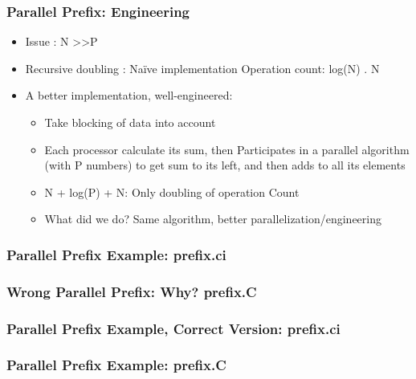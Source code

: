 \documentclass{beamer}
\begin{document}
\begin{frame}[fragile]
  \frametitle{Parallel Prefix: Engineering}
  \begin{itemize}
    \item Issue : N \textgreater \textgreater  P
    \item Recursive doubling : Naïve implementation
    Operation count: log(N) . N
    \item A better implementation, well-engineered:
    \begin{itemize}
    \item Take blocking of data into account
    \item Each processor calculate its sum, then 
            Participates in a parallel algorithm (with P numbers) 
            to get sum to its left, and then adds to all its elements
    \item N + log(P) + N: Only doubling of operation Count
    \item What did we do?
    Same algorithm, better parallelization/engineering
    \end{itemize}
  \end{itemize}
\end{frame}


\begin{frame}[fragile]
  \frametitle{Parallel Prefix Example: prefix.ci}
  
\end{frame}

\begin{frame}[allowframebreaks]
  \frametitle{Wrong Parallel Prefix: Why? prefix.C}
  
\end{frame}

\begin{frame}[fragile]
  \frametitle{Parallel Prefix Example, Correct Version: prefix.ci}
  
\end{frame}

\begin{frame}[allowframebreaks]
  \frametitle{Parallel Prefix Example: prefix.C}
  
\end{frame}
\end{document}
